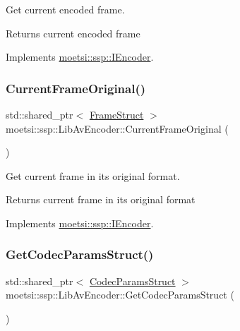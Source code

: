 Get current encoded frame. 

\begin{DoxyReturn}{Returns}
current encoded frame 
\end{DoxyReturn}


Implements \hyperlink{classmoetsi_1_1ssp_1_1IEncoder_a178d117518e7c7007414ea9c82bd3ed6}{moetsi\+::ssp\+::\+I\+Encoder}.

\mbox{\label{classmoetsi_1_1ssp_1_1LibAvEncoder_a249c65ad557f438d6856e875f01a1947}} 
\subsubsection{\texorpdfstring{Current\+Frame\+Original()}{CurrentFrameOriginal()}}
{\footnotesize\ttfamily std\+::shared\+\_\+ptr$<$ \hyperlink{structmoetsi_1_1ssp_1_1FrameStruct}{Frame\+Struct} $>$ moetsi\+::ssp\+::\+Lib\+Av\+Encoder\+::\+Current\+Frame\+Original (\begin{DoxyParamCaption}{ }\end{DoxyParamCaption})\hspace{0.3cm}{\ttfamily [virtual]}}



Get current frame in its original format. 

\begin{DoxyReturn}{Returns}
current frame in its original format 
\end{DoxyReturn}


Implements \hyperlink{classmoetsi_1_1ssp_1_1IEncoder_ab60bdaae0a85289dfa31a12bab533dc0}{moetsi\+::ssp\+::\+I\+Encoder}.

\mbox{\label{classmoetsi_1_1ssp_1_1LibAvEncoder_a2ff6afafbb5da48e900d34d70a46d00c}} 
\subsubsection{\texorpdfstring{Get\+Codec\+Params\+Struct()}{GetCodecParamsStruct()}}
{\footnotesize\ttfamily std\+::shared\+\_\+ptr$<$ \hyperlink{structmoetsi_1_1ssp_1_1CodecParamsStruct}{Codec\+Params\+Struct} $>$ moetsi\+::ssp\+::\+Lib\+Av\+Encoder\+::\+Get\+Codec\+Params\+Struct (\begin{DoxyParamCaption}{ }\end{DoxyParamCaption})\hspace{0.3cm}{\ttfamily [virtual]}}



